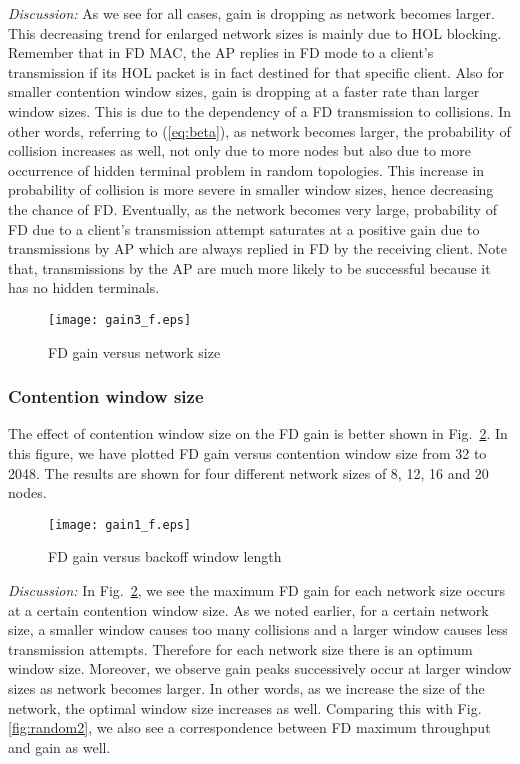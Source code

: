 \documentclass[10pt,journal,cspaper,compsoc]{IEEEtran}
\begin{document}
\textit{Discussion:} As we see for all cases, gain is dropping as network becomes larger. This decreasing trend for enlarged network sizes is mainly due to HOL blocking. Remember that in FD MAC, the AP replies in FD mode to a client's transmission if its HOL packet is in fact destined for that specific client. Also for smaller contention window sizes, gain is dropping at a faster rate than larger window sizes. This is due to the dependency of a FD transmission to collisions. In other words, referring to (\ref{eq:beta}), as network becomes larger, the probability of collision increases as well, not only due to more nodes but also due to more occurrence of hidden terminal problem in random topologies. This increase in probability of collision is more severe in smaller window sizes, hence decreasing the chance of FD. Eventually, as the network becomes very large, probability of FD due to a client's transmission attempt saturates at a positive gain due to transmissions by AP which are always replied in FD by the receiving client. Note that, transmissions by the AP are much more likely to be successful because it has no hidden terminals.
\begin{figure}[!t]
	\centering
	\texttt{[image: gain3\_f.eps]}
	\caption{FD gain versus network size}
	\label{fig:gnhW}
\end{figure} 

\subsubsection{Contention window size}
The effect of contention window size on the FD gain is better shown in Fig.~\ref{fig:gWnh}. In this figure, we have plotted FD gain versus contention window size from 32 to 2048. The results are shown for four different network sizes of 8, 12, 16 and 20 nodes. 

\begin{figure}[!t]
	\centering
	\texttt{[image: gain1\_f.eps]}
	\caption{FD gain versus backoff window length}
	\label{fig:gWnh}
\end{figure} 

\textit{Discussion:} In Fig.~\ref{fig:gWnh}, we see the maximum FD gain for each network size occurs at a certain contention window size. As we noted earlier, for a certain network size, a smaller window causes too many collisions and a larger window causes less transmission attempts. Therefore for each network size there is an optimum window size. Moreover, we observe gain peaks successively occur at larger window sizes as network becomes larger. In other words, as we increase the size of the network, the optimal window size increases as well. Comparing this with Fig. \ref{fig:random2}, we also see a correspondence between FD maximum throughput and gain as well. 
\end{document}
